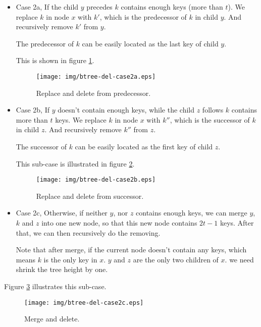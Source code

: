 \documentclass[UTF8]{article}
\begin{document}
\begin{itemize}
\item Case 2a, If the child $y$ precedes $k$ contains enough keys (more than $t$).
We replace $k$ in node $x$ with $k'$, which is
the predecessor of $k$ in child $y$. And recursively remove $k'$
from $y$.

The predecessor of $k$ can be easily located as the last key of child
$y$.

This is shown in figure \ref{fig:btree-del-case2a}.

\begin{figure}[htbp]
  \centering
    \texttt{[image: img/btree-del-case2a.eps]}
    \caption{Replace and delete from predecessor.} \label{fig:btree-del-case2a}
\end{figure}

\item Case 2b, If $y$ doesn't contain enough keys, while the child $z$
follows $k$ contains more than $t$ keys. We replace $k$ in node $x$
with $k''$, which is the successor of $k$ in child $z$. And recursively
remove $k''$ from $z$.

The successor of $k$ can be easily located as the first key of child $z$.

This sub-case is illustrated in figure \ref{fig:btree-del-case2b}.

\begin{figure}[htbp]
  \centering
    \texttt{[image: img/btree-del-case2b.eps]}
    \caption{Replace and delete from successor.} \label{fig:btree-del-case2b}
\end{figure}

\item Case 2c, Otherwise, if neither $y$, nor $z$ contains enough keys, we
can merge $y$, $k$ and $z$ into one new node, so that this new node
contains $2t-1$ keys. After that, we can then recursively do the removing.

Note that after merge, if the current node doesn't contain any keys,
which means $k$ is the only key in $x$. $y$ and $z$ are the only two
children of $x$. we need shrink the tree height by one.
\end{itemize}

Figure \ref{fig:btree-del-case2c} illustrates this sub-case.

\begin{figure}[htbp]
  \centering
    \texttt{[image: img/btree-del-case2c.eps]}
    \caption{Merge and delete.} \label{fig:btree-del-case2c}
\end{figure}
\end{document}
